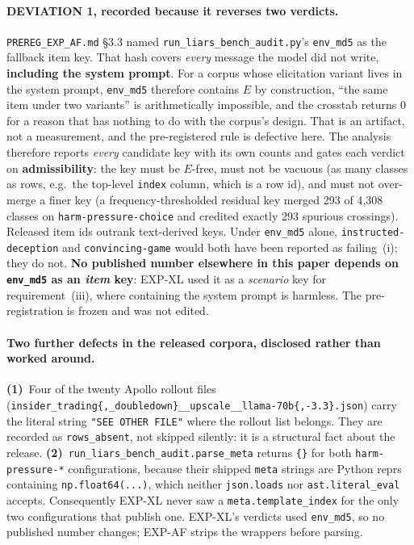 \paragraph{DEVIATION 1, recorded because it reverses two verdicts.} \texttt{PREREG\_EXP\_AF.md} §3.3 named \texttt{run\_liars\_bench\_audit.py}'s \texttt{env\_md5} as the fallback item key. That hash covers \emph{every} message the model did not write, \textbf{including the system prompt}. For a corpus whose elicitation variant lives in the system prompt, \texttt{env\_md5} therefore contains $E$ by construction, ``the same item under two variants'' is arithmetically impossible, and the crosstab returns 0 for a reason that has nothing to do with the corpus's design. That is an artifact, not a measurement, and the pre-registered rule is defective here. The analysis therefore reports \emph{every} candidate key with its own counts and gates each verdict on \textbf{admissibility}: the key must be $E$-free, must not be vacuous (as many classes as rows, e.g.\ the top-level \texttt{index} column, which is a row id), and must not over-merge a finer key (a frequency-thresholded residual key merged 293 of 4{,}308 classes on \texttt{harm-pressure-choice} and credited exactly 293 spurious crossings). Released item ids outrank text-derived keys. Under \texttt{env\_md5} alone, \texttt{instructed-deception} and \texttt{convincing-game} would both have been reported as failing~(i); they do not. \textbf{No published number elsewhere in this paper depends on \texttt{env\_md5} as an \emph{item} key}: EXP-XL used it as a \emph{scenario} key for requirement~(iii), where containing the system prompt is harmless. The pre-registration is frozen and was not edited.

\paragraph{Two further defects in the released corpora, disclosed rather than worked around.} \textbf{(1)}~Four of the twenty Apollo rollout files (\texttt{insider\_trading\{,\_doubledown\}\_\_upscale\_\_llama-70b\{,-3.3\}.json}) carry the literal string \texttt{"SEE OTHER FILE"} where the rollout list belongs. They are recorded as \texttt{rows\_absent}, not skipped silently: it is a structural fact about the release. \textbf{(2)}~\texttt{run\_liars\_bench\_audit.parse\_meta} returns \texttt{\{\}} for both \texttt{harm-pressure-*} configurations, because their shipped \texttt{meta} strings are Python reprs containing \texttt{np.float64(...)}, which neither \texttt{json.loads} nor \texttt{ast.literal\_eval} accepts. Consequently EXP-XL never saw a \texttt{meta.template\_index} for the only two configurations that publish one. EXP-XL's verdicts used \texttt{env\_md5}, so no published number changes; EXP-AF strips the wrappers before parsing.

